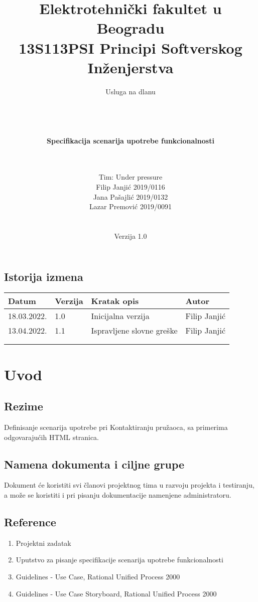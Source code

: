 \documentclass[a4paper,12pt]{report}
\title{\Large Elektrotehnički fakultet u Beogradu \\ 13S113PSI Principi Softverskog Inženjerstva}
\author{\Huge Usluga na dlanu\\ \ \\ \ \\ \ \\ \ \\
	\Large \textbf{Specifikacija scenarija upotrebe funkcionalnosti}\\\Large \textbf{\genitivfunkcionalnosti} \\ \ \\}
\date{\Large   Tim: Under pressure \\ Filip Janjić 2019/0116 \\ Jana Pašajlić 2019/0132 \\ Lazar Premović 2019/0091  \\ \  \\ \  \\
	\large Verzija 1.0}
\newcommand{\dativfunkcionalnosti }{Kontaktiranju pružaoca}
\newcommand{\inicijalniautor}{Filip Janjić}
\newcommand{\inicijalnidatum}{18.03.2022.}
\begin{document}
	
	\maketitle
	
	\begin{center}
		\section*{Istorija izmena}
			\begin{tabular}{ |l|l|l|l| }
				\hline
				\textbf{Datum} & \textbf{Verzija} & \textbf{Kratak opis} & \textbf{Autor} \\ 
				\hline
				\inicijalnidatum & 1.0  & Inicijalna verzija & \inicijalniautor \\
				\hline
				13.04.2022. & 1.1  & Ispravljene slovne greške & \inicijalniautor \\
				\hline
				&  &  &  \\
				\hline
				&  &  &  \\
				\hline
			\end{tabular}
	\end{center}
	
	\newpage
	
	\tableofcontents
	
	\newpage
	
	\section{Uvod}
		\subsection{Rezime}
			Definisanje scenarija upotrebe pri \dativfunkcionalnosti, sa primerima odgovarajućih HTML stranica.
		\subsection{Namena dokumenta i ciljne grupe}
			Dokument će koristiti svi članovi projektnog tima u razvoju projekta i testiranju, a može se koristiti i pri pisanju dokumentacije namenjene administratoru.
		\subsection{Reference}
			\begin{enumerate}
				\item Projektni zadatak
				\item Uputstvo za pisanje specifikacije scenarija upotrebe funkcionalnosti
				\item Guidelines - Use Case, Rational Unified Process 2000
				\item Guidelines - Use Case Storyboard, Rational Unified Process 2000
			\end{enumerate}
\end{document}
